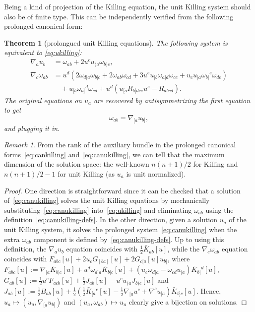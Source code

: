 \documentclass[a4paper]{article}
\newtheorem{thm}{Theorem}
\theoremstyle{remark}
\newtheorem{rem}{Remark}
\begin{document}
Being a kind of projection of the Killing equation, the unit Killing
system should also be of finite type. This can be independently verified
from the following prolonged canonical form:
\begin{thm}[prolongued unit Killing equations] \label{thm:canukilling}
The following system is equivalent to \eqref{eq:ukilling}:
\begin{equation} \label{eq:canukilling}
\begin{aligned}
	\nabla_a u_b &= \omega_{ab} + 2 u^c u_{(a}\omega_{b)c}, \\
	\nabla_c \omega_{ab} &=
		u^d (2 \omega_{d[a}\omega_{b]c} + 2 \omega_{ab}\omega_{cd} + 3 u^e u_{[b}\omega_{a]d}\omega_{ce} + u_c u_{[a}\omega_{b]}{}^e \omega_{de})
		\\ & \quad {}
		+ u_{[b}\omega_{a]}{}^d \omega_{cd}
		+ u^d (u_{[a} R_{b]dce} u^e - R_{abcd})
	.
\end{aligned}
\end{equation}
The original equations on $u_a$ are recovered by antisymmetrizing the first
equation to get
\begin{equation} \label{eq:canukilling-defs}
	\omega_{ab} = \nabla_{[a}u_{b]},
\end{equation}
and plugging it in.
\end{thm}

\begin{rem}
From the rank of the auxiliary bundle in the prolonged canonical
forms~\eqref{eq:cankilling} and~\eqref{eq:canukilling}, we can tell that
the maximum dimension of the solution space: the well-known $n(n+1)/2$
for Killing and $n(n+1)/2-1$ for unit Killing (as $u_a$ is unit
normalized).
\end{rem}

\begin{proof}
One direction is straightforward since it can be checked that a solution of~\eqref{eq:canukilling} solves the unit Killing equations by mechanically substituting~\eqref{eq:canukilling} into~\eqref{eq:ukilling} and eliminating $\omega_{ab}$ using the definition~\eqref{eq:canukilling-defs}. In the other direction, given a solution $u_a$ of
the unit Killing system, it solves the prolonged system~\eqref{eq:canukilling} when
the extra $\omega_{ab}$ component is defined
by~\eqref{eq:canukilling-defs}. Up to using this definition, the $\nabla_a u_b$
equation coincides with $\frac12 \bar{K}_{ab}[u]$, while the $\nabla_c \omega_{ab}$ equation coincides with
$F_{abc}[u] + 2 u_c G_{[ba]}[u] + 2G_{c[a}[u] u_{b]}$, where $F_{abc}[u] := \nabla_{[a} \bar{K}_{b]c}[u] + u^d \omega_{d[a} \bar{K}_{b]c}[u] + (u_c \omega_{d[a} - \omega_{cd} u_{[a}) \bar{K}_{b]}{}^d [u] $, $G_{ab}[u] := \frac12 u^c F_{acb}[u] + \frac12 J_{ab}[u] - u^c u_{(a} J_{b)c}[u]$ and $J_{ab}[u] := \frac12 B_{ab}[u] + \frac12 ( \frac12\bar{K}_{[a}{}^c [u] - \frac12 \nabla_{[a} u^c + \nabla^c u_{[a}) \bar{K}_{b]c}[u]$. Hence, $u_a \mapsto (u_a, \nabla_{[a} u_{b]})$ and $(u_a, \omega_{ab}) \mapsto u_a$ clearly give a bijection on solutions.
\end{proof}
\end{document}
